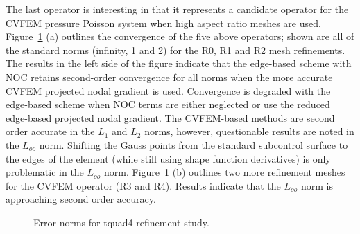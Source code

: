 The last operator is interesting in that it represents a candidate operator for the CVFEM pressure Poisson system when high aspect ratio 
meshes are used. Figure~\ref{fig:laplaceTquad} (a) outlines the convergence of the five above operators; shown are all of the standard 
norms (infinity, 1 and 2) for the R0, R1 and R2 mesh refinements. The results in the left side of the figure indicate that the edge-based scheme with NOC retains second-order 
convergence for all norms when the more accurate CVFEM projected nodal gradient is used. Convergence is degraded with the edge-based scheme when NOC terms 
are either neglected or use the reduced edge-based projected nodal gradient. The CVFEM-based methods are second order accurate 
in the $L_1$ and $L_2$ norms, however, questionable results are noted in the $L_{oo}$ norm. Shifting the Gauss points from the standard 
subcontrol surface to the edges of the element (while still using shape function derivatives) is only problematic in the $L_{oo}$ norm.
Figure~\ref{fig:laplaceTquad} (b) outlines two more refinement meshes for the CVFEM operator (R3 and R4). Results indicate that the $L_{oo}$
norm is approaching second order accuracy.

\begin{figure}
  \centering
  \vspace{0.1in}
  \caption{Error norms for tquad4 refinement study.}
  \label{fig:laplaceTquad}
\end{figure}

